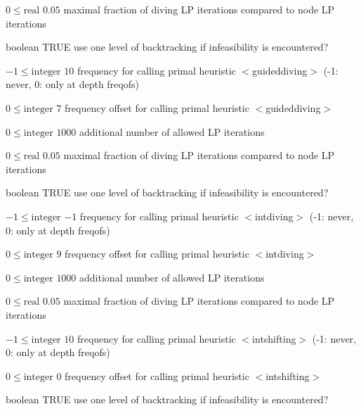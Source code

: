 %
{$0\leq\textrm{real}$}%
{$0.05$}%
{maximal fraction of diving LP iterations compared to node LP iterations}%
{}

%
{boolean}%
{TRUE}%
{use one level of backtracking if infeasibility is encountered?}%
{}

%
{$-1\leq\textrm{integer}$}%
{$10$}%
{frequency for calling primal heuristic $<$guideddiving$>$ (-1: never, 0: only at depth freqofs)}%
{}

%
{$0\leq\textrm{integer}$}%
{$7$}%
{frequency offset for calling primal heuristic $<$guideddiving$>$}%
{}

%
{$0\leq\textrm{integer}$}%
{$1000$}%
{additional number of allowed LP iterations}%
{}

%
{$0\leq\textrm{real}$}%
{$0.05$}%
{maximal fraction of diving LP iterations compared to node LP iterations}%
{}

%
{boolean}%
{TRUE}%
{use one level of backtracking if infeasibility is encountered?}%
{}

%
{$-1\leq\textrm{integer}$}%
{$-1$}%
{frequency for calling primal heuristic $<$intdiving$>$ (-1: never, 0: only at depth freqofs)}%
{}

%
{$0\leq\textrm{integer}$}%
{$9$}%
{frequency offset for calling primal heuristic $<$intdiving$>$}%
{}

%
{$0\leq\textrm{integer}$}%
{$1000$}%
{additional number of allowed LP iterations}%
{}

%
{$0\leq\textrm{real}$}%
{$0.05$}%
{maximal fraction of diving LP iterations compared to node LP iterations}%
{}

%
{$-1\leq\textrm{integer}$}%
{$10$}%
{frequency for calling primal heuristic $<$intshifting$>$ (-1: never, 0: only at depth freqofs)}%
{}

%
{$0\leq\textrm{integer}$}%
{$0$}%
{frequency offset for calling primal heuristic $<$intshifting$>$}%
{}

%
{boolean}%
{TRUE}%
{use one level of backtracking if infeasibility is encountered?}%
{}

